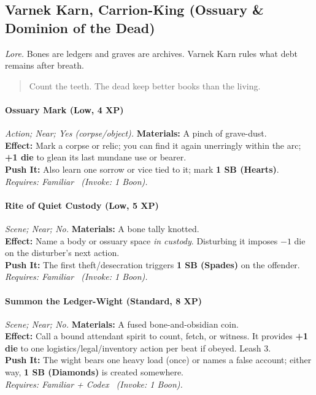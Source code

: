 \subsection{Varnek Karn, Carrion-King (Ossuary \& Dominion of the Dead)}
\textit{Lore.} Bones are ledgers and graves are archives. Varnek Karn rules what debt remains after breath.

\begin{quote}
Count the teeth. The dead keep better books than the living.
\end{quote}

\paragraph{Ossuary Mark (Low, 4 XP)} \emph{Action; Near; Yes (corpse/object).}
\textbf{Materials:} A pinch of grave-dust.\\
\textbf{Effect:} Mark a corpse or relic; you can find it again unerringly within the arc; \textbf{+1 die} to glean its last mundane use or bearer.\\
\textbf{Push It:} Also learn one sorrow or vice tied to it; mark \textbf{1 SB (Hearts)}.\\
\emph{Requires: Familiar \ (\textit{Invoke:} 1 Boon).}

\paragraph{Rite of Quiet Custody (Low, 5 XP)} \emph{Scene; Near; No.}
\textbf{Materials:} A bone tally knotted.\\
\textbf{Effect:} Name a body or ossuary space \emph{in custody}. Disturbing it imposes \(-1\) die on the disturber’s next action.\\
\textbf{Push It:} The first theft/desecration triggers \textbf{1 SB (Spades)} on the offender.\\
\emph{Requires: Familiar \ (\textit{Invoke:} 1 Boon).}

\paragraph{Summon the Ledger-Wight (Standard, 8 XP)} \emph{Scene; Near; No.}
\textbf{Materials:} A fused bone-and-obsidian coin.\\
\textbf{Effect:} Call a bound attendant spirit to count, fetch, or witness. It provides \textbf{+1 die} to one logistics/legal/inventory action per beat if obeyed. Leash 3.\\
\textbf{Push It:} The wight bears one heavy load (once) or names a false account; either way, \textbf{1 SB (Diamonds)} is created somewhere.\\
\emph{Requires: Familiar + Codex \ (\textit{Invoke:} 1 Boon).}

